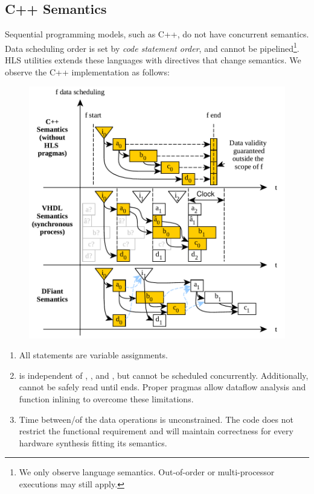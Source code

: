 \subsection{C++ Semantics}
Sequential programming models, such as C++, do not have concurrent semantics. Data scheduling order is set by \textit{code statement order}, and cannot be pipelined\footnote{We only observe language semantics. Out-of-order or multi-processor executions may still apply.}. HLS utilities extends these languages with  directives that change semantics. We observe the C++  implementation as follows:

\begin{figure}[t]
  \vspace*{-6ex}
  \centering
  \includegraphics[width=\linewidth]{graphics/DataScheduling.pdf}
  \label{fig:DataSchedGraph}
\end{figure}

\begin{enumerate}
  \item All statements are variable assignments.
  \item {} is independent of , , and , but cannot be scheduled concurrently. Additionally,  cannot be safely read until  ends. Proper pragmas allow dataflow analysis and function inlining to overcome these limitations.
  \item Time between/of the data operations is unconstrained. The code does not restrict the functional requirement and will maintain correctness for every hardware synthesis fitting its semantics. 
\end{enumerate}  

